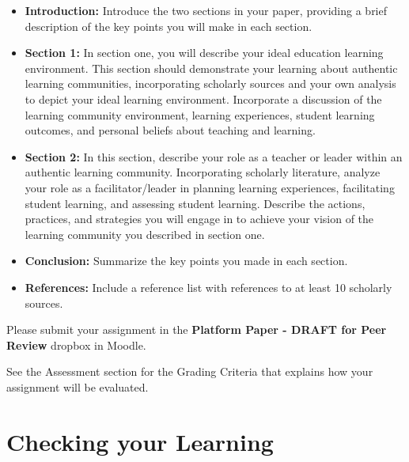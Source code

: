 \documentclass[
]{book}
\providecommand{\tightlist}{%
  \setlength{\itemsep}{0pt}\setlength{\parskip}{0pt}}
\begin{document}
\begin{assessment}
\begin{itemize}
\tightlist
\item
  \textbf{Introduction:} Introduce the two sections in your paper,
  providing a brief description of the key points you will make in each
  section.
\item
  \textbf{Section 1:} In section one, you will describe your ideal
  education learning environment. This section should demonstrate your
  learning about authentic learning communities, incorporating scholarly
  sources and your own analysis to depict your ideal learning
  environment. Incorporate a discussion of the learning community
  environment, learning experiences, student learning outcomes, and
  personal beliefs about teaching and learning.
\item
  \textbf{Section 2:} In this section, describe your role as a teacher
  or leader within an authentic learning community. Incorporating
  scholarly literature, analyze your role as a facilitator/leader in
  planning learning experiences, facilitating student learning, and
  assessing student learning. Describe the actions, practices, and
  strategies you will engage in to achieve your vision of the learning
  community you described in section one.
\item
  \textbf{Conclusion:} Summarize the key points you made in each
  section.
\item
  \textbf{References:} Include a reference list with references to at
  least 10 scholarly sources.
\end{itemize}

Please submit your assignment in the \textbf{Platform Paper - DRAFT for
Peer Review} dropbox in Moodle.

See the Assessment section for the Grading Criteria that explains how
your assignment will be evaluated.
\end{assessment}

\hypertarget{checking-your-learning-7}{%
\section*{Checking your Learning}\label{checking-your-learning-7}}
\end{document}
